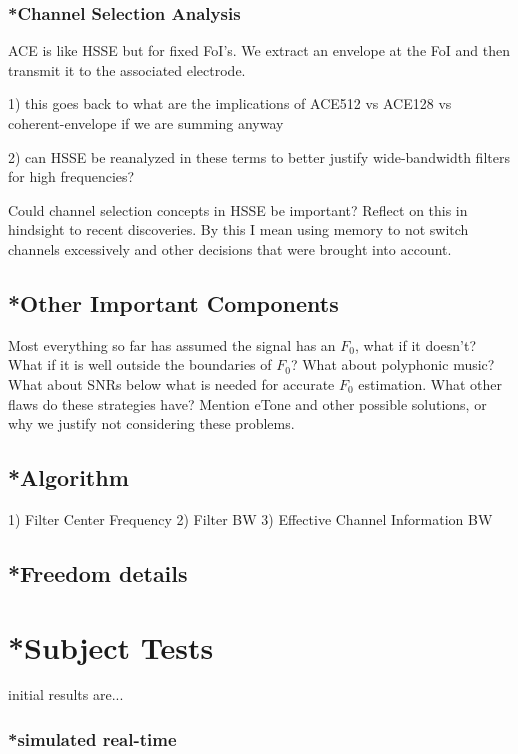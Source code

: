 \documentclass [11pt, proquest] {uwthesis}[2015/03/03]
\begin{document}
\subsection{*Channel Selection Analysis}

ACE is like HSSE but for fixed FoI's.  We extract an envelope at the FoI and then transmit it to the associated electrode.

1) this goes back to what are the implications of ACE512 vs ACE128 vs coherent-envelope if we are summing anyway

2) can HSSE be reanalyzed in these terms to better justify wide-bandwidth filters for high frequencies?

Could channel selection concepts in HSSE be important?  Reflect on this in hindsight to recent discoveries.  By this I mean using memory to not switch channels excessively and other decisions that were brought into account.

\section{*Other Important Components}

Most everything so far has assumed the signal has an $F_0$, what if it doesn't?  What if it is well outside the boundaries of $F_0$?  What about polyphonic music?  What about SNRs below what is needed for accurate $F_0$ estimation.  What other flaws do these strategies have?  Mention eTone and other possible solutions, or why we justify not considering these problems.

\section{*Algorithm}

1) Filter Center Frequency
2) Filter BW
3) Effective Channel Information BW

\section{*Freedom details}


\chapter{*Subject Tests}
initial results are...


	\subsection{*simulated real-time}
	
\end{document}
